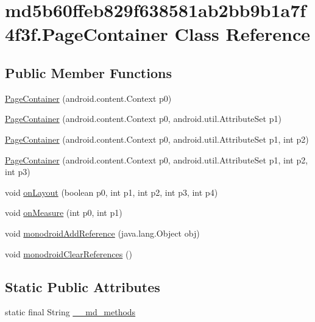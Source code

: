 \hypertarget{classmd5b60ffeb829f638581ab2bb9b1a7f4f3f_1_1_page_container}{
\section{md5b60ffeb829f638581ab2bb9b1a7f4f3f.PageContainer Class Reference}
\label{classmd5b60ffeb829f638581ab2bb9b1a7f4f3f_1_1_page_container}
}
\subsection*{Public Member Functions}
\begin{CompactItemize}
\item 
\hyperlink{classmd5b60ffeb829f638581ab2bb9b1a7f4f3f_1_1_page_container_09eff7efc044cb7fe8bad3d17dcef2bf}{PageContainer} (android.content.Context p0)
\item 
\hyperlink{classmd5b60ffeb829f638581ab2bb9b1a7f4f3f_1_1_page_container_d550ad5dcde007c81aaee8e4be4778c1}{PageContainer} (android.content.Context p0, android.util.AttributeSet p1)
\item 
\hyperlink{classmd5b60ffeb829f638581ab2bb9b1a7f4f3f_1_1_page_container_f875cc61d7fd276d67a7364fc9282d2b}{PageContainer} (android.content.Context p0, android.util.AttributeSet p1, int p2)
\item 
\hyperlink{classmd5b60ffeb829f638581ab2bb9b1a7f4f3f_1_1_page_container_ea67ff0782cec21a82e2017351bda69f}{PageContainer} (android.content.Context p0, android.util.AttributeSet p1, int p2, int p3)
\item 
void \hyperlink{classmd5b60ffeb829f638581ab2bb9b1a7f4f3f_1_1_page_container_163d7ce92b315c58198349b7f05f1a91}{onLayout} (boolean p0, int p1, int p2, int p3, int p4)
\item 
void \hyperlink{classmd5b60ffeb829f638581ab2bb9b1a7f4f3f_1_1_page_container_24278f432b2d8c0d9076c33f97a373e2}{onMeasure} (int p0, int p1)
\item 
void \hyperlink{classmd5b60ffeb829f638581ab2bb9b1a7f4f3f_1_1_page_container_3221cf5a81133b548c2ee9f69f366643}{monodroidAddReference} (java.lang.Object obj)
\item 
void \hyperlink{classmd5b60ffeb829f638581ab2bb9b1a7f4f3f_1_1_page_container_8480055a790d8945498bfcf3c95fc165}{monodroidClearReferences} ()
\end{CompactItemize}
\subsection*{Static Public Attributes}
\begin{CompactItemize}
\item 
static final String \hyperlink{classmd5b60ffeb829f638581ab2bb9b1a7f4f3f_1_1_page_container_e38d550383eecfab33e3bb31102278db}{\_\-\_\-md\_\-methods}
\end{CompactItemize}
